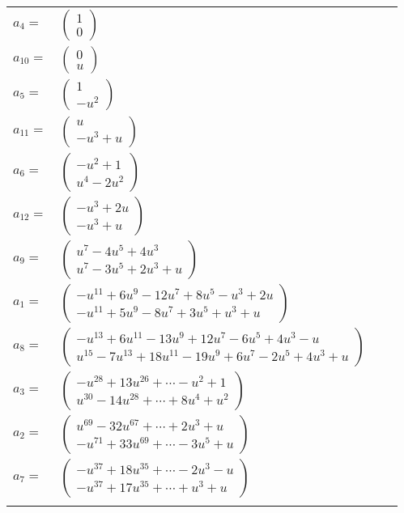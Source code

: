 \documentclass[1p]{elsarticle_modified}
\theoremstyle{definition}
\begin{document}
\begin{tabular}{m{7pt} m{180pt} m{7pt} m{180pt} }
\flushright $a_{4}=$&$\begin{pmatrix}1\\0\end{pmatrix}$ \\
\flushright $a_{10}=$&$\begin{pmatrix}0\\u\end{pmatrix}$ \\
\flushright $a_{5}=$&$\begin{pmatrix}1\\- u^2\end{pmatrix}$ \\
\flushright $a_{11}=$&$\begin{pmatrix}u\\- u^3+u\end{pmatrix}$ \\
\flushright $a_{6}=$&$\begin{pmatrix}- u^2+1\\u^4-2 u^2\end{pmatrix}$ \\
\flushright $a_{12}=$&$\begin{pmatrix}- u^3+2 u\\- u^3+u\end{pmatrix}$ \\
\flushright $a_{9}=$&$\begin{pmatrix}u^7-4 u^5+4 u^3\\u^7-3 u^5+2 u^3+u\end{pmatrix}$ \\
\flushright $a_{1}=$&$\begin{pmatrix}- u^{11}+6 u^9-12 u^7+8 u^5- u^3+2 u\\- u^{11}+5 u^9-8 u^7+3 u^5+u^3+u\end{pmatrix}$ \\
\flushright $a_{8}=$&$\begin{pmatrix}- u^{13}+6 u^{11}-13 u^9+12 u^7-6 u^5+4 u^3- u\\u^{15}-7 u^{13}+18 u^{11}-19 u^9+6 u^7-2 u^5+4 u^3+u\end{pmatrix}$ \\
\flushright $a_{3}=$&$\begin{pmatrix}- u^{28}+13 u^{26}+\cdots- u^2+1\\u^{30}-14 u^{28}+\cdots+8 u^4+u^2\end{pmatrix}$ \\
\flushright $a_{2}=$&$\begin{pmatrix}u^{69}-32 u^{67}+\cdots+2 u^3+u\\- u^{71}+33 u^{69}+\cdots-3 u^5+u\end{pmatrix}$ \\
\flushright $a_{7}=$&$\begin{pmatrix}- u^{37}+18 u^{35}+\cdots-2 u^3- u\\- u^{37}+17 u^{35}+\cdots+u^3+u\end{pmatrix}$\\&\end{tabular}
\end{document}

